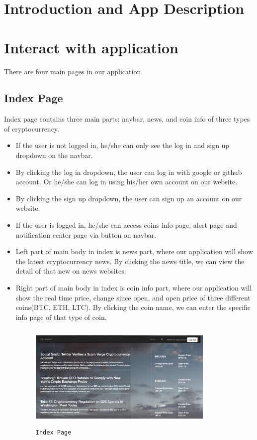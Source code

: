 \section{Introduction and App Description}



\section{Interact with application}
There are four main pages in our application.
\subsection{Index Page}
Index page contains three main parts: navbar, news, and coin info of three types 
of cryptocurrency.
\begin{itemize}
\item If the user is not logged in, he/she can only see the log in and sign up
dropdown on the navbar. 
\item By clicking the log in dropdown, the user can log in with google or github
account. Or he/she can log in using his/her own account on our website.
\item By clicking the sign up dropdown, the user can sign up an account on our 
website.
\item If the user is logged in, he/she can access coins info page, alert page
and notification center page via button on navbar.
\item Left part of main body in index is news part, where our application will
show the latest cryptocurrency news. By clicking the news title, we can view the
detail of that new on news websites.
\item Right part of main body in index is coin info part, where our application 
will show the real time price, change since open, and open price of three different 
coins(BTC, ETH, LTC). By clicking the coin name, we can enter the specific info 
page of that type of coin.
\begin{figure}[!htb]
\includegraphics[height=2.0in, width=3.5in]{index.png}
\caption{\texttt{Index Page}}
\end{figure}
\end{itemize}


